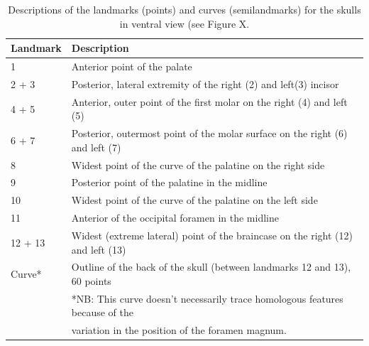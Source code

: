 \begin{table}[h]
\caption[Skulls: ventral landmarks]
		{Descriptions of the landmarks (points) and curves (semilandmarks) for the skulls in ventral view (see Figure X.} 
\begin{tabular}[t]{l l}		
\hline
\textbf{Landmark} & \textbf{Description} \\
\hline
1 & Anterior point of the palate\\
2 + 3 & Posterior, lateral extremity of the right (2) and left(3) incisor\\
4 + 5 & Anterior, outer point of the first molar on the right (4) and left (5)\\
6 + 7 & Posterior, outermost point of the molar surface on the right (6) and left (7) \\
8 & Widest point of the curve of the palatine on the right side\\
9 & Posterior point of the palatine in the midline\\
10 & Widest point of the curve of the palatine on the left side\\
11 & Anterior of the occipital foramen in the midline\\
12 + 13 & Widest (extreme lateral) point of the braincase on the right (12) and left (13)\\
Curve* & Outline of the back of the skull (between landmarks 12 and 13), 60 points \\
\hline
&*NB: This curve doesn't necessarily trace homologous features because of the \\ 
& variation in the position of the foramen magnum.
\end{tabular}
\label{tab:skvent}
\end{table}
